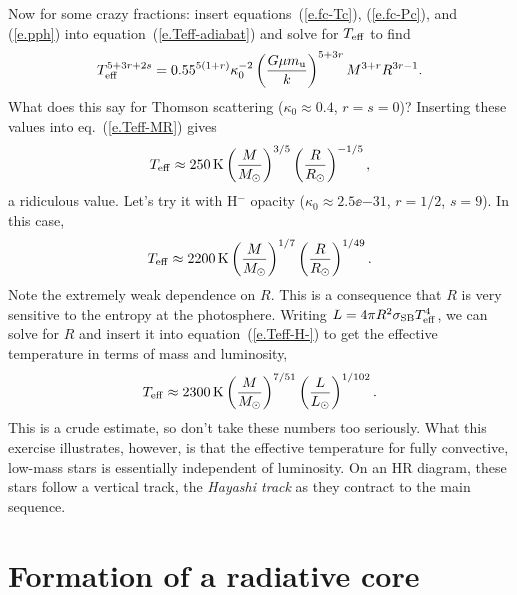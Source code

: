 Now for some crazy fractions: insert equations~(\ref{e.fc-Tc}), (\ref{e.fc-Pc}), and (\ref{e.pph}) into equation~(\ref{e.Teff-adiabat}) and solve for $T_{\mathrm{eff}}$ to find
\begin{equation}\label{e.Teff-MR}
T_{\mathrm{eff}}^{5+3r+2s} = 0.55^{5(1+r)}\kappa_{0}^{-2} \left(\frac{G\mu m_\mathrm{u}}{k}\right)^{5+3r}M^{3+r} R^{3r-1}.
\end{equation}
What does this say for Thomson scattering ($\kappa_{0} \approx 0.4$, $r=s=0$)? Inserting these values into eq.~(\ref{e.Teff-MR}) gives
\begin{equation}\label{e.Teff-th}
	T_{\mathrm{eff}} \approx 250\,\mathrm{K} \left(\frac{M}{M_\odot}\right)^{3/5}\left(\frac{R}{R_{\odot}}\right)^{-1/5},
\end{equation}
a ridiculous value. Let's try it with H$^{-}$ opacity ($\kappa_{0} \approx 2.5\ee{-31}$, $r=1/2$, $s=9$). In this case,
\begin{equation}\label{e.Teff-H-}
 T_{\mathrm{eff}} \approx 2200\,\mathrm{K} \left(\frac{M}{M_\odot}\right)^{1/7}\left(\frac{R}{R_{\odot}}\right)^{1/49}.
\end{equation}
Note the extremely weak dependence on $R$.  This is a consequence that $R$ is very sensitive to the entropy at the photosphere.  Writing $L = 4\pi R^{2}\sigma_{\mathrm{SB}} T_{\mathrm{eff}}^{4}$, we can solve for $R$ and insert it into equation~(\ref{e.Teff-H-}) to get the effective temperature in terms of mass and luminosity,
\begin{equation}\label{e.Hayashi}
 T_{\mathrm{eff}} \approx 2300\,\mathrm{K} \left(\frac{M}{M_\odot}\right)^{7/51}\left(\frac{L}{L_{\odot}}\right)^{1/102}.
\end{equation}
This is a crude estimate, so don't take these numbers too seriously. What this exercise illustrates, however, is that the effective temperature for fully convective, low-mass stars is essentially independent of luminosity.  On an HR diagram, these stars follow a vertical track, the \emph{Hayashi track} as they contract to the main sequence.

\section{Formation of a radiative core}

